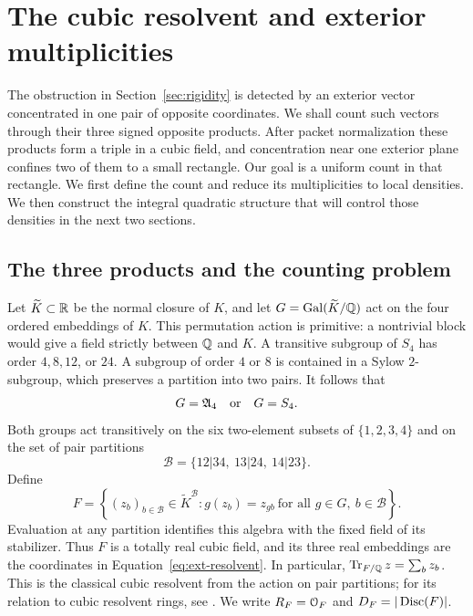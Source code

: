 \section{The cubic resolvent and exterior multiplicities}
\label{sec:exterior}

The obstruction in Section~\ref{sec:rigidity} is detected by an exterior
vector concentrated in one pair of opposite coordinates.  We shall count
such vectors through their three signed opposite products.  After packet
normalization these products form a triple in a cubic field, and
concentration near one exterior plane confines
two of them to a small rectangle.  Our goal is a uniform count in that
rectangle.  We first define the count and reduce its multiplicities to local
densities.  We then construct the integral quadratic structure that will
control those densities in the next two sections.

\subsection{The three products and the counting problem}

Let \(\widetilde K\subset\mathbb R\) be the normal closure of \(K\), and let
\(G=\operatorname{Gal}(\widetilde K/\mathbb Q)\) act on the four ordered embeddings of \(K\).
This permutation action is primitive: a nontrivial block would give a field
strictly between \(\mathbb Q\) and \(K\).  A transitive subgroup of \(S_4\) has
order \(4,8,12\), or \(24\).  A subgroup of order \(4\) or \(8\) is contained
in a Sylow \(2\)-subgroup, which preserves a partition into two pairs.
It follows that
\[
G=\mathfrak A_4\quad\hbox{or}\quad G=S_4.
\]
Both groups act transitively on the six two-element subsets of
\(\{1,2,3,4\}\) and on the set of pair partitions
\[
\mathcal B=\{12|34,\ 13|24,\ 14|23\}.
\]
Define
\begin{equation}
 F=\left\{(z_b)_{b\in\mathcal B}\in\widetilde K^{\mathcal B}:
       g(z_b)=z_{gb}\ \text{for all }g\in G,\ b\in\mathcal B\right\}.
 \label{eq:ext-resolvent}
\end{equation}
Evaluation at any partition identifies this algebra with the fixed field
of its stabilizer.  Thus \(F\) is a totally real cubic field, and its three
real embeddings are the coordinates in Equation~\eqref{eq:ext-resolvent}.
In particular, \(\operatorname{Tr}_{F/\mathbb Q}z=\sum_b z_b\).  This is the classical cubic
resolvent from the action on pair partitions; for its relation to cubic
resolvent rings, see \cite[Section~2.3]{Bhargava2004III}.  We write
\(R_F=\mathcal O_F\) and \(D_F=|\operatorname{Disc}(F)|\).

